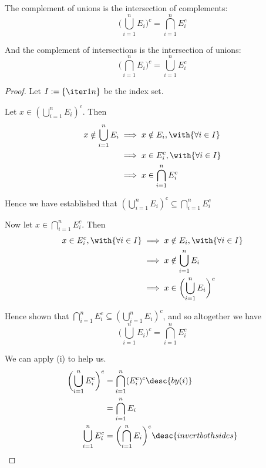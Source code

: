 
\label{c28492b}

\begin{enumerati}
  \item The complement of unions is the intersection of complements:
  $$
    \biggl(\bigcup_{i=1}^nE_i\biggr)^c=\bigcap_{i=1}^nE_i^c
  $$
  \item And the complement of intersections is the intersection of unions:
  $$
    \biggl(\bigcap_{i=1}^nE_i\biggr)^c=\bigcup_{i=1}^nE_i^c
  $$
\end{enumerati}

\begin{proof}
  Let $I:=\{\iter1n\}$ be the index set.

   Let $x\in(\bigcup_{i=1}^nE_i)^c$. Then
  \begin{align*}
    x\notin\bigcup_{i=1}^nE_i
     &\implies x\notin E_i,\with{\forall i\in I} \\
     &\implies x\in E_i^c,\with{\forall i\in I}  \\
     &\implies x\in\bigcap_{i=1}^nE_i^c
  \end{align*}

  Hence we have established that
  $(\bigcup_{i=1}^nE_i)^c\subseteq\bigcap_{i=1}^nE_i^c$

  Now let $x\in\bigcap_{i=1}^nE_i^c$. Then
  \begin{align*}
    x\in E_i^c,\with{\forall i\in I}
     &\implies x\notin E_i,\with{\forall i\in I}      \\
     &\implies x\notin\bigcup_{i=1}^nE_i              \\
     &\implies x\in\biggl(\bigcup_{i=1}^nE_i\biggr)^c
  \end{align*}

  Hence shown that $\bigcap_{i=1}^nE_i^c\subseteq(\bigcup_{i=1}^nE_i)^c$, and
  so altogether we have
  $$
    \biggl(\bigcup_{i=1}^nE_i\biggr)^c=\bigcap_{i=1}^nE_i^c
  $$

   We can apply (i) to help us.
  \begin{align*}
    \biggl(\bigcup_{i=1}^nE_i^c\biggr)^c
     &=\bigcap_{i=1}^n(E_i^c)^c\desc{by (i)}                      \\
     &=\bigcap_{i=1}^nE_i                                         \\
    \bigcup_{i=1}^nE_i^c
     &=\biggl(\bigcap_{i=1}^nE_i\biggr)^c\desc{invert both sides}
  \end{align*}
\end{proof}
